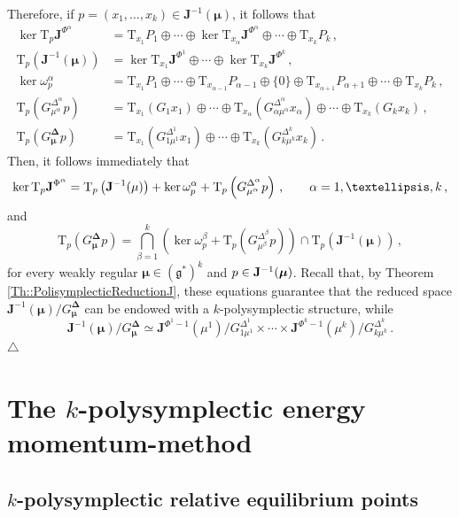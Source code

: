 \documentclass[11pt]{article}
\theoremstyle{plain}
\theoremstyle{definition}
\newcommand{\T}{\mathrm{T}}
\newcommand{\x}{\times}
\newcommand\xqed[1]{%
    \leavevmode\unskip\penalty9999 \hbox{}\nobreak\hfill
	\quad\hbox{#1}}
\newcommand\demo{\xqed{$\triangle$}}
\numberwithin{equation}{section}
\begin{document}
Therefore, if $p=(x_1,\ldots,x_k)\in\mathbf{J}^{-1}(\bm\mu)$, it follows that
\begin{align}
    \ker\T_p \mathbf{J}^{\Phi^\alpha} &= \T_{x_1}P_1\oplus\dotsb\oplus \ker \T_{x_\alpha} \mathbf{J}^{\Phi^\alpha}\oplus\dotsb\oplus \T_{x_k}P_k\,,\\
    \T_p\left(\mathbf{J}^{-1}(\bm\mu)\right)&=\ker \T_{x_1}\mathbf{J}^{\Phi^1}\oplus\dotsb\oplus \ker \T_{x_k}\mathbf{J}^{\Phi^k}\,,\\
    \ker \omega_p^\alpha &= \T_{x_1}P_1\oplus\dotsb\oplus \T_{x_{\alpha-1}}P_{\alpha-1}\oplus \{0\}\oplus \T_{x_{\alpha+1}}P_{\alpha+1}\oplus\dotsb\oplus \T_{x_k}P_k\,,\\
    \T_p\left(G^{\Delta^\alpha}_{\mu^\alpha}p\right) &= \T_{x_1}\left(G_1 x_1\right)\oplus\dotsb\oplus \T_{x_\alpha}\left(G^{\Delta^\alpha}_{\alpha\mu^\alpha}x_\alpha\right)\oplus\dotsb\oplus \T_{x_k}\left(G_{k}x_k\right)\,,\\
    \T_p\left(G_{\bm\mu}^{\bm\Delta} p\right) &= \T_{x_1}\left(G^{\Delta^1}_{1\mu^1}x_1\right)\oplus\dotsb\oplus \T_{x_k}\left(G^{\Delta^k}_{k\mu^k}x_k\right)\,.
\end{align}
Then, it follows immediately that
$$
\ker\T_p\mathbf{J}^{\Phi^\alpha} = \T_p\left( \mathbf{J}^{-1}({\bf \mu})\right)+\ker\omega_p^\alpha+ \T_p\left(G^{\Delta^\alpha}_{\mu^\alpha}p\right) \,,\qquad \alpha=1,\ldots,k\,,
$$
and
$$
\T_p\left(G_{\bm\mu}^{\bm\Delta} p\right)=\bigcap^k_{\beta=1}\left(\ker\omega_p^\beta + \T_p\left(G^{\Delta^\beta}_{\mu^\beta}p\right)\right)\cap  \T_p\left(\mathbf{J}^{-1}(\bm\mu)\right)\,,
$$
for every weakly regular $\bm\mu\in (\mathfrak{g}^*)^k$ and $p\in {\bf J}^{-1}({\bm \mu})$. Recall that, by Theorem \ref{Th::PolisymplecticReductionJ}, these equations guarantee that the reduced space $\mathbf{J}^{-1}(\bm\mu)/G^{\bm\Delta}_{\bm\mu}$ can be endowed with a $k$-polysymplectic structure, while
\[
\mathbf{J}^{-1}(\bm\mu)/G^{\bm\Delta}_{\bm\mu}\simeq \mathbf{J}^{\Phi^1-1}(\mu^1)/G^{\Delta^1}_{1\mu^1}\x\dotsb\x \mathbf{J}^{\Phi^k-1}(\mu^k)/G^{\Delta^k}_{k\mu^k}\,.
\]
\demo




\section{The \texorpdfstring{$k$}{}-polysymplectic energy momentum-method}\label{Sec::energy-momentum}

\subsection{\texorpdfstring{$k$}{}-polysymplectic relative equilibrium points}
\end{document}

